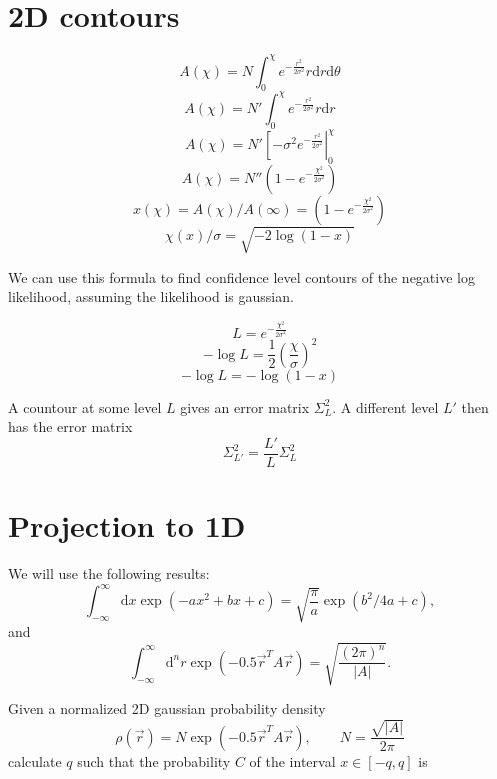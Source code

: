 \documentclass[12pt]{article}
\newcommand{\dee}{\mathrm{d}}
\newcommand{\abs}[1]{\left|#1\right|}
\begin{document}
\section{2D contours}

\[A(\chi) = N\int_0^\chi e^{-\frac{r^2}{2\sigma^2}} r\dee r\dee\theta\]
\[A(\chi) = N'\int_0^\chi e^{-\frac{r^2}{2\sigma^2}} r\dee r\]
\[A(\chi) = N'\left[-\sigma^2e^{-\frac{r^2}{2\sigma^2}}\right|_0^\chi\]
\[A(\chi) = N''\left(1-e^{-\frac{\chi^2}{2\sigma^2}}\right)\]
\[x(\chi) = A(\chi)/A(\infty) = \left(1-e^{-\frac{\chi^2}{2\sigma^2}}\right)\]
\[\chi(x)/\sigma = \sqrt{-2\log(1-x)}\]

We can use this formula to find confidence level contours of the
negative log likelihood, assuming the likelihood is gaussian.

\[L = e^{-\frac{\chi^2}{2\sigma^2}}\]
\[-\log L = \frac{1}{2}\left(\frac{\chi}{\sigma}\right)^2\]
\[-\log L = -\log( 1-x )\]

A countour at some level $L$ gives an error matrix $\Sigma^2_L$.  A
different level $L'$ then has the error matrix
\[\Sigma^2_{L'} = \frac{L'}{L}\Sigma^2_L\]

\section{Projection to 1D}

We will use the following results:
\begin{equation}
  \int_{-\infty}^{\infty}\dee x \exp\left(-ax^2+bx+c\right) = \sqrt{\frac{\pi}{a}}\exp\left(b^2/4a + c\right),
\end{equation}
and
\begin{equation}
  \int_{-\infty}^\infty \dee^nr\exp\left(-0.5 \vec{r}^TA\vec{r}\right) = \sqrt{\frac{(2\pi)^n}{\abs{A}}}.
\end{equation}

Given a normalized 2D gaussian probability density
\[
\rho(\vec{r}) = N \exp(-0.5 \vec{r}^TA\vec{r}), \qquad N = \frac{\sqrt{\abs{A}}}{2\pi}
\]
calculate $q$ such that the probability $C$ of the interval
$x\in[-q,q]$ is
\end{document}
